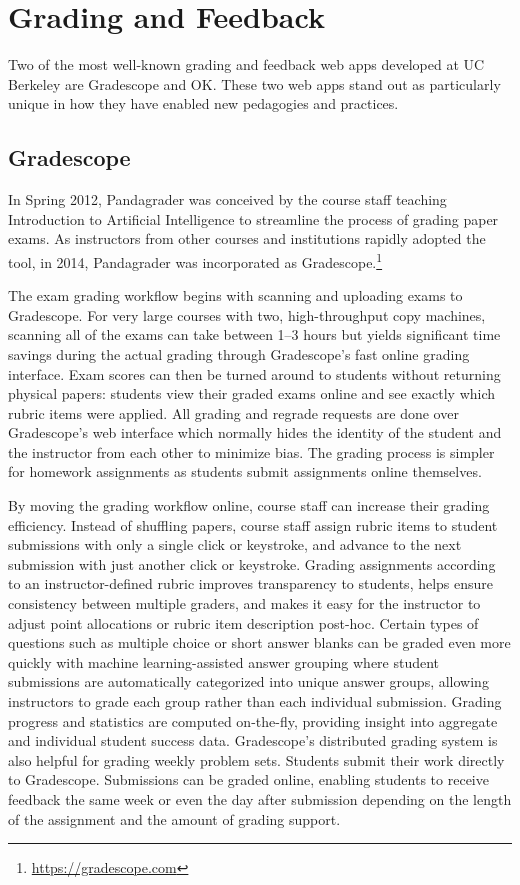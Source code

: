 \section{Grading and Feedback}

Two of the most well-known grading and feedback web apps developed at UC Berkeley are Gradescope and OK. These two web apps stand out as particularly unique in how they have enabled new pedagogies and practices.

\subsection{Gradescope}

In Spring 2012, Pandagrader was conceived by the course staff teaching Introduction to Artificial Intelligence to streamline the process of grading paper exams. As instructors from other courses and institutions rapidly adopted the tool, in 2014, Pandagrader was incorporated as Gradescope.\footnote{\url{https://gradescope.com}}

The exam grading workflow begins with scanning and uploading exams to Gradescope. For very large courses with two, high-throughput copy machines, scanning all of the exams can take between 1--3 hours but yields significant time savings during the actual grading through Gradescope's fast online grading interface. Exam scores can then be turned around to students without returning physical papers: students view their graded exams online and see exactly which rubric items were applied. All grading and regrade requests are done over Gradescope's web interface which normally hides the identity of the student and the instructor from each other to minimize bias. The grading process is simpler for homework assignments as students submit assignments online themselves.

By moving the grading workflow online, course staff can increase their grading efficiency. Instead of shuffling papers, course staff assign rubric items to student submissions with only a single click or keystroke, and advance to the next submission with just another click or keystroke. Grading assignments according to an instructor-defined rubric improves transparency to students, helps ensure consistency between multiple graders, and makes it easy for the instructor to adjust point allocations or rubric item description post-hoc. Certain types of questions such as multiple choice or short answer blanks can be graded even more quickly with machine learning-assisted answer grouping where student submissions are automatically categorized into unique answer groups, allowing instructors to grade each group rather than each individual submission. Grading progress and statistics are computed on-the-fly, providing insight into aggregate and individual student success data. Gradescope's distributed grading system is also helpful for grading weekly problem sets. Students submit their work directly to Gradescope. Submissions can be graded online, enabling students to receive feedback the same week or even the day after submission depending on the length of the assignment and the amount of grading support.

